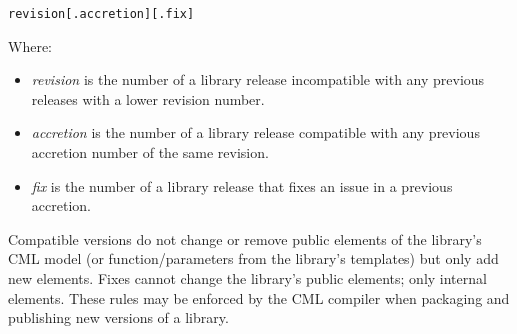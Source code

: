\verbatimfont{\small}
\begin{verbatim}
revision[.accretion][.fix]
\end{verbatim}

Where:
\begin{itemize}
\item \emph{revision} is the number of a library release incompatible with any previous releases with a lower revision number.
\item \emph{accretion} is the number of a library release compatible with any previous accretion number of the same revision.
\item \emph{fix} is the number of a library release that fixes an issue in a previous accretion.
\end{itemize}

Compatible versions do not change or remove public elements of the library's CML model (or function/parameters from the library's templates) but only add new elements. Fixes cannot change the library's public elements; only internal elements. These rules may be enforced by the CML compiler when packaging and publishing new versions of a library.
